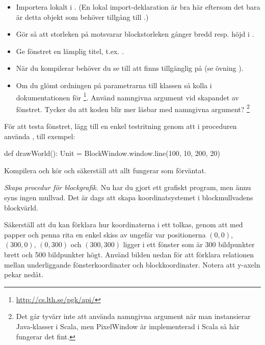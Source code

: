 \begin{itemize}%
  \item Importera  lokalt i . (En lokal import-deklaration är bra här eftersom det bara är detta objekt som behöver tillgång till .)
  \item Gör så att storleken på  motsvarar blockstorleken gånger bredd resp. höjd i .
  \item Ge fönstret en lämplig titel, t.ex. .
  \item När du kompilerar behöver du se till att  finns tillgänglig på  (se övning \texttt{\ExeWeekFOUR}).
  \item Om du glömt ordningen på parametrarna till klassen  så kolla i dokumentationen för  \footnote{\url{http://cs.lth.se/pgk/api/}}. Använd namngivna argument vid skapandet av fönstret. Tycker du att koden blir mer läsbar med namngivna argument? \footnote{Det går tyvärr inte att använda namngivna argument när man instansierar Java-klasser i Scala, men PixelWindow är implementerad i Scala så här fungerar det fint.}
\end{itemize}

För att testa fönstret, lägg till en enkel testritning genom att i proceduren  använda , till exempel:
\begin{Code}
  def drawWorld(): Unit = 
    BlockWindow.window.line(100, 10, 200, 20)
\end{Code}
Kompilera och kör och säkerställ att allt fungerar som förväntat.


\Task \emph{Skapa procedur för blockgrafik.} Nu har du gjort ett grafiskt program, men ännu syns ingen mullvad.
Det är dags att skapa koordinatsystemet i blockmullvadens blockvärld.

\Subtask\Pen
Säkerställ att du kan förklara hur koordinaterna i ett  tolkas, genom att med papper och penna rita en enkel skiss av ungefär var positionerna $(0,0)$, $(300, 0)$, $(0, 300)$ och $(300, 300)$ ligger i ett fönster som är 300 bildpunkter brett och 500 bildpunkter högt. Använd bilden nedan för att förklara relationen mellan underliggande fönsterkoordinater och blockkoordinater. Notera att y-axeln pekar nedåt.

